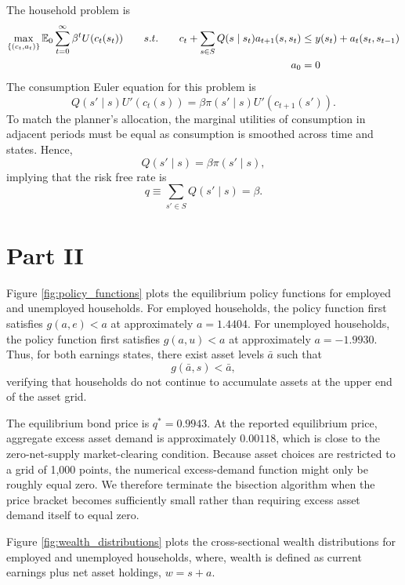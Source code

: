 \documentclass{article}
\begin{document}
        The household problem is 
        \begin{align*}
            \max_{\{(c_t, a_t)\}} \mathbb{E}_0 \sum_{t=0}^\infty \beta^t U(c_t(s_t)) 
            \qquad s.t. \qquad 
            c_t + \sum_{s \in S} Q(s \mid s_t) a_{t+1}(s, s_t) &\leq y(s_t) + a_t (s_t, s_{t-1})\\
            a_0 &= 0
        \end{align*}
        The consumption Euler equation for this problem is
        \[
            Q(s' \mid s) U'(c_t(s)) = \beta \pi(s' \mid s) U'(c_{t+1}(s')).
        \]
        To match the planner's allocation, the marginal utilities of consumption in adjacent periods must be equal as consumption is 
        smoothed across time and states. Hence, 
        \[
            Q(s' \mid s) = \beta \pi(s' \mid s),
        \]
        implying that the risk free rate is 
        \[
            q \equiv \sum_{s' \in S}Q(s' \mid s) = \beta.
        \]


    \section*{Part II}

        Figure \ref{fig:policy_functions} plots the equilibrium policy functions
        for employed and unemployed households. For employed households, the
        policy function first satisfies $g(a,e)<a$ at approximately $a=1.4404$.
        For unemployed households, the policy function first satisfies
        $g(a,u)<a$ at approximately $a=-1.9930$. Thus, for both earnings states,
        there exist asset levels $\bar{a}$ such that
        \[
            g(\bar{a},s)<\bar{a},
        \]
        verifying that households do not continue to accumulate assets at the
        upper end of the asset grid.

        The equilibrium bond price is $q^* = 0.9943.$
        At the reported equilibrium price, aggregate excess asset demand is
        approximately $0.00118$, which is close to the zero-net-supply
        market-clearing condition. Because asset choices are restricted to a
        grid of 1,000 points, the numerical excess-demand function might only be roughly
        equal zero. We therefore terminate the bisection algorithm when
        the price bracket becomes sufficiently small rather than requiring
        excess asset demand itself to equal zero.

        Figure \ref{fig:wealth_distributions} plots the cross-sectional wealth
        distributions for employed and unemployed households, where, wealth is defined 
        as current earnings plus net asset
        holdings, $w = s+a.$
        
\end{document}
